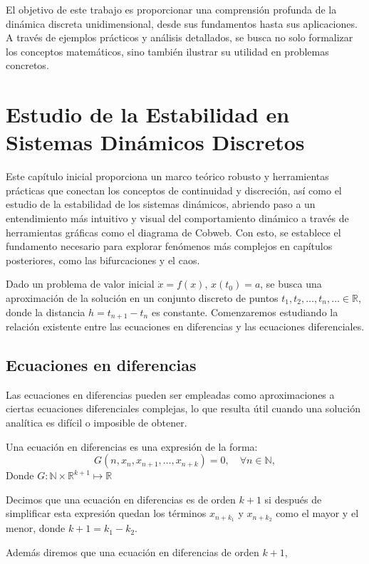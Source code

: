 \documentclass[12pt,a4paper]{report}
\theoremstyle{definition}
\begin{document}
El objetivo de este trabajo es proporcionar una comprensión profunda de la dinámica discreta unidimensional, desde sus fundamentos hasta sus aplicaciones. A través de ejemplos prácticos y análisis detallados, se busca no solo formalizar los conceptos matemáticos, sino también ilustrar su utilidad en problemas concretos.

\chapter{Estudio de la Estabilidad en Sistemas Dinámicos Discretos}\label{chap:dinamica_discreta}

Este capítulo inicial proporciona un marco teórico robusto y herramientas prácticas que conectan los conceptos de continuidad y discreción, así como el estudio de la estabilidad de los sistemas dinámicos, abriendo paso a un entendimiento más intuitivo y visual del comportamiento dinámico a través de herramientas gráficas como el diagrama de Cobweb. Con esto, se establece el fundamento necesario para explorar fenómenos más complejos en capítulos posteriores, como las bifurcaciones y el caos.

Dado un problema de valor inicial \(\dot{x} = f(x)\), \(x(t_0) = a\), se busca una aproximación de la solución en un conjunto discreto de puntos \(t_1, t_2, \ldots, t_n, \ldots \in \mathbb{R}\), donde la distancia \(h = t_{n+1} - t_n\) es constante. Comenzaremos estudiando la relación existente entre las ecuaciones en diferencias y las ecuaciones diferenciales. 

\section{Ecuaciones en diferencias}
 
Las ecuaciones en diferencias pueden ser empleadas como aproximaciones a ciertas ecuaciones diferenciales complejas, lo que resulta útil cuando una solución analítica es difícil o imposible de obtener.

Una ecuación en diferencias es una expresión de la forma:
\[
G(n, x_n,x_{n+1}, \ldots, x_{n+k}) = 0, \quad \forall n \in \mathbb{N},
\]
%
Donde  $G:\mathbb{N} \times \mathbb{R}^{k+1}  \mapsto \mathbb{R}$ 

Decimos que una ecuación en diferencias es de orden $k+1$ si después de simplificar esta expresión quedan los términos 
\( x_{n+k_1} \) y \( x_{n+k_2} \) como el mayor y el menor,  donde \( k +1= k_1 - k_2 \).

Además diremos que una ecuación en diferencias de orden $k+1$,  
\end{document}
